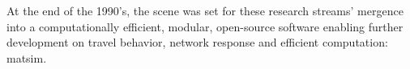 

At the end of the 1990’s, the scene was set for these research streams' mergence %
into a computationally 
efficient, modular, open-source software enabling further development on travel behavior, network response and efficient computation: \gls{matsim}.




%

